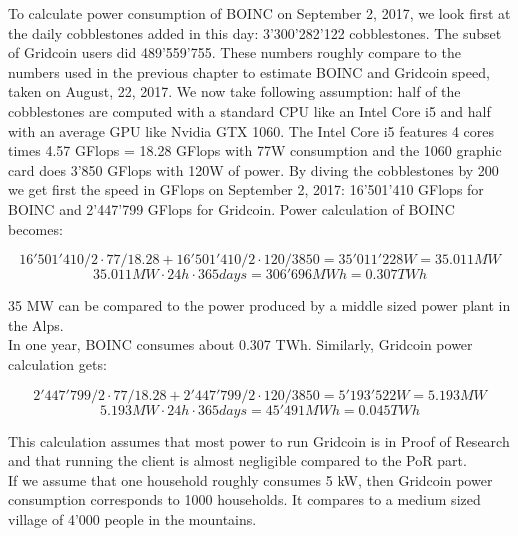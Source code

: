 To calculate power consumption of BOINC on September 2, 2017, we look first at the daily cobblestones added in this day: 3'300'282'122 cobblestones. The subset of Gridcoin users did 489'559'755. These numbers roughly compare to the numbers used in the previous chapter to estimate BOINC and Gridcoin speed, taken on August, 22, 2017. We now take following assumption: half of the cobblestones are computed with a standard CPU like an Intel Core i5 and half with an average GPU like Nvidia GTX 1060. The Intel Core i5 features 4 cores times 4.57 GFlops = 18.28 GFlops with 77W consumption and the 1060 graphic card does 3'850 GFlops with 120W of power. By diving the cobblestones by 200 we get first the speed in GFlops on September 2, 2017: 16'501'410 GFlops for BOINC and 2'447'799 GFlops for Gridcoin. Power calculation of BOINC becomes:

\[ 16'501'410/2 \cdot 77/18.28 + 16'501'410/2 \cdot 120/3850 = 35'011'228 W = 35.011 MW \]
\[ 35.011MW \cdot 24 h \cdot 365 days = 306'696 MWh = 0.307 TWh \]

35 MW can be compared to the power produced by a middle sized power plant in the Alps. \\
In one year, BOINC consumes about 0.307 TWh. Similarly, Gridcoin power calculation gets:

\[ 2'447'799/2 \cdot 77/18.28 + 2'447'799/2 \cdot 120/3850 = 5'193'522 W = 5.193 MW \]
\[ 5.193MW \cdot 24 h \cdot 365 days = 45'491 MWh = 0.045 TWh \]

This calculation assumes that most power to run Gridcoin is in Proof of Research and that running the client is almost negligible compared to the PoR part.\\
If we assume that one household roughly consumes 5 kW, then Gridcoin power consumption corresponds to 1000 households. It compares to a medium sized village of 4'000 people in the mountains.\\


